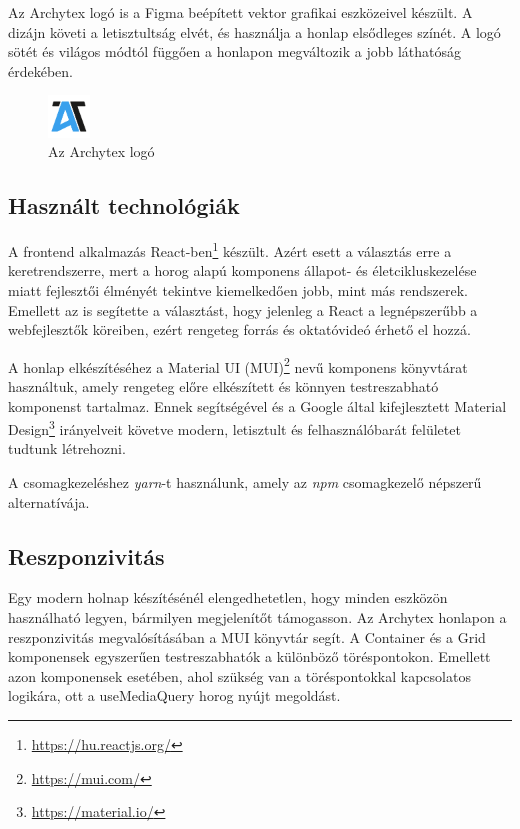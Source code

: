 Az Archytex logó is a Figma beépített vektor grafikai eszközeivel készült. A dizájn követi a letisztultság elvét, és használja a honlap elsődleges színét. A logó sötét és világos módtól függően a honlapon megváltozik a jobb láthatóság érdekében.

\begin{figure}[h]
  \centering
  \includegraphics[width=0.1\textwidth]{parts/developer-documentation/frontend/images/logo.png}
  \caption{Az Archytex logó}
\end{figure}

\subsection{Használt technológiák}
A frontend alkalmazás React-ben\footnote{\url{https://hu.reactjs.org/}} készült. Azért esett a választás erre a keretrendszerre, mert a horog alapú komponens állapot- és életcikluskezelése miatt fejlesztői élményét tekintve kiemelkedően jobb, mint más rendszerek. Emellett az is segítette a választást, hogy jelenleg a React a legnépszerűbb a webfejlesztők köreiben\cite{most-used-web-frameworks}, ezért rengeteg forrás és oktatóvideó érhető el hozzá.

A honlap elkészítéséhez a Material UI (MUI)\footnote{\url{https://mui.com/}} nevű komponens könyvtárat használtuk, amely rengeteg előre elkészített és könnyen testreszabható komponenst tartalmaz. Ennek segítségével és a Google által kifejlesztett Material Design\footnote{\url{https://material.io/}} irányelveit követve modern, letisztult és felhasználóbarát felületet tudtunk létrehozni.

A csomagkezeléshez \emph{yarn}-t használunk, amely az \emph{npm} csomagkezelő népszerű alternatívája.

\subsection{Reszponzivitás}
Egy modern holnap készítésénél elengedhetetlen, hogy minden eszközön használható legyen, bármilyen megjelenítőt támogasson. Az Archytex honlapon a reszponzivitás megvalósításában a MUI könyvtár segít. A Container és a Grid komponensek egyszerűen testreszabhatók a különböző töréspontokon. Emellett azon komponensek esetében, ahol szükség van a töréspontokkal kapcsolatos logikára, ott a useMediaQuery horog nyújt megoldást.

